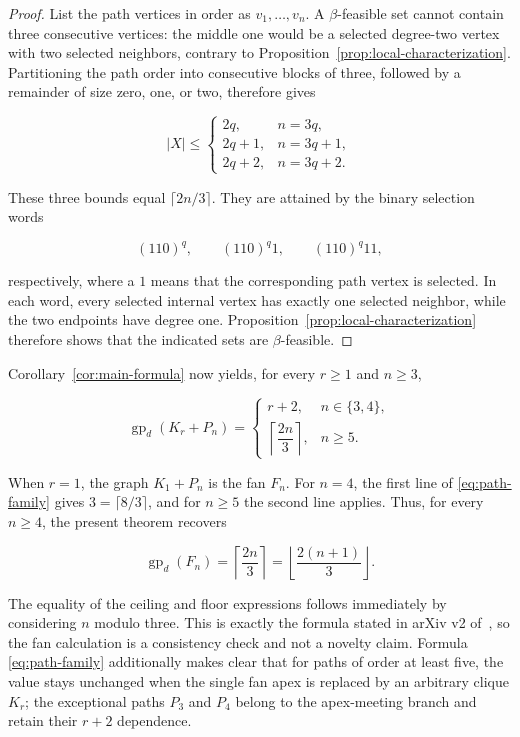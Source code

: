 \documentclass[11pt,a4paper]{article}
\numberwithin{equation}{section}
\begin{document}
\begin{proof}
List the path vertices in order as \(v_1,\ldots,v_n\). A
\(\beta\)-feasible set cannot contain three consecutive vertices: the
middle one would be a selected degree-two vertex with two selected
neighbors, contrary to Proposition~\ref{prop:local-characterization}. Partitioning the path order into
consecutive blocks of three, followed by a remainder of size zero, one,
or two, therefore gives

\[
|X|\le
\begin{cases}
2q,&n=3q,\\
2q+1,&n=3q+1,\\
2q+2,&n=3q+2.
\end{cases}
\]

These three bounds equal \(\lceil 2n/3\rceil\). They are attained by the
binary selection words

\[
(110)^q,\qquad (110)^q1,\qquad (110)^q11,
\]

respectively, where a \(1\) means that the corresponding path vertex is
selected. In each word, every selected internal vertex has exactly one
selected neighbor, while the two endpoints have degree one.
Proposition~\ref{prop:local-characterization} therefore shows that the
indicated sets are \(\beta\)-feasible.
\end{proof}

Corollary~\ref{cor:main-formula} now yields, for every \(r\ge 1\) and \(n\ge 3\),

\begin{equation}\label{eq:path-family}
\operatorname{gp}_d(K_r+P_n)=
\begin{cases}
r+2,&n\in\{3,4\},\\
\left\lceil\dfrac{2n}{3}\right\rceil,&n\ge 5.
\end{cases}
\end{equation}

When \(r=1\), the graph \(K_1+P_n\) is the fan \(F_n\). For \(n=4\), the
first line of \eqref{eq:path-family} gives \(3=\lceil 8/3\rceil\), and for \(n\ge 5\) the
second line applies. Thus, for every \(n\ge 4\), the present theorem
recovers

\[
\operatorname{gp}_d(F_n)
=\left\lceil\frac{2n}{3}\right\rceil
=\left\lfloor\frac{2(n+1)}{3}\right\rfloor.
\]

The equality of the ceiling and floor expressions follows immediately by
considering \(n\) modulo three. This is exactly the formula stated in arXiv
v2 of~\cite{tian-et-al-removal}, so the fan calculation is a consistency
check and not a novelty claim. Formula \eqref{eq:path-family} additionally makes clear
that for paths of order at least five, the value stays unchanged when
the single fan apex is replaced by an arbitrary clique \(K_r\); the
exceptional paths \(P_3\) and \(P_4\) belong to the apex-meeting branch
and retain their \(r+2\) dependence.
\end{document}
